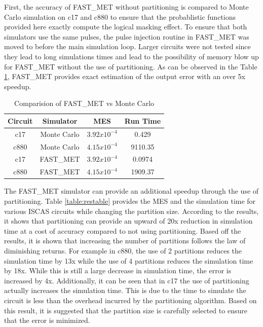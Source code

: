 First, the accuracy of FAST\_MET without partitioning is compared to Monte Carlo simulation on c17 and c880 to ensure that the probablistic functions provided here exactly compute the logical masking effect. To ensure that both simulators use the same pulses, the pulse injection routine in FAST\_MET was moved to before the main simulation loop. Larger circuits were not tested since they lead to long simulations times and lead to the possibility of memory blow up for FAST\_MET without the use of partitioning. As can be observed in the Table \ref{table:MCvFAST}, FAST\_MET provides exact estimation of the output error with an over 5x speedup.

\begin{table}[ht]
	\begin{center}
		\caption{Comparision of FAST\_MET vs Monte Carlo}
		\label{table:MCvFAST}
		\begin{tabular}{|c|c|c|c|}
			\hline
			Circuit& Simulator & MES & Run Time\\ 
			\hline
			c17 & Monte Carlo & $3.92x10^{-4}$ & 0.429\\
			\hline
			c880 & Monte Carlo & $4.15x10^{-4}$ & 9110.35\\
			\hline
			c17 & FAST\_MET & $3.92x10^{-4}$ & 0.0974\\
			\hline
			c880 & FAST\_MET & $4.15x10^{-4}$ & 1909.37\\
			\hline
		\end{tabular}
	\end{center}
\end{table}

The FAST\_MET simulator can provide an additional speedup through the use of partitioning. Table \ref{table:restable} provides the MES and the simulation time for various ISCAS circuits while changing the partition size. According to the results, it shows that partitioning can provide an upward of 20x reduction in simulation time at a cost of accuracy compared to not using partitioning. Based off the results, it is shown that increasing the number of partitions follows the law of diminishing returns. For example in c880, the use of 2 partitions reduces the simulation time by 13x while the use of 4 partitions reduces the simulation time by 18x. While this is still a large decrease in simulation time, the error is increased by 4x. Additionally, it can be seen that in c17 the use of partitioning actually increases the simulation time. This is due to the time to simulate the circuit is less than the overhead incurred by the partitioning algorithm. Based on this result, it is suggested that the partition size is carefully selected to ensure that the error is minimized.

